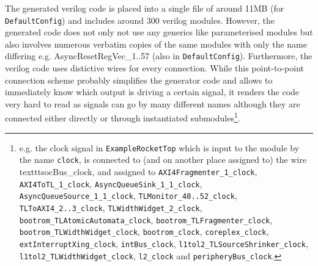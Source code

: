 \documentclass[journal,a4paper]{IEEEtran}
\begin{document}
The generated verilog code is placed into a single file of around 11MB (for \texttt{DefaultConfig}) and includes around 300 verilog modules.
However, the generated code does not only not use any generics like parameterised modules but also involves numerous verbatim copies of the same modules with only the name differing e.g. AsyncResetRegVec\_1..57 (also in \texttt{DefaultConfig}).
Furthermore, the verilog code uses distictive wires for every connection. While this point-to-point connection scheme probably simplifies the generator code and allows to immediately know which output is driving a certain signal, it renders the code very hard to read as signals can go by many different names although they are connected either directly or through instantiated submodules\footnote{e.g. the clock signal in \texttt{ExampleRocketTop} which is input to the module by the name \texttt{clock}, is connected to (and on another place assigned to) the wire texttt{socBus\_clock}, and assigned to \texttt{AXI4Fragmenter\_1\_clock}, \texttt{AXI4ToTL\_1\_clock}, \texttt{AsyncQueueSink\_1\_1\_clock}, \texttt{AsyncQueueSource\_1\_1\_clock}, \texttt{TLMonitor\_40..52\_clock}, \texttt{TLToAXI4\_2..3\_clock}, \texttt{TLWidthWidget\_2\_clock}, \texttt{bootrom\_TLAtomicAutomata\_clock}, \texttt{bootrom\_TLFragmenter\_clock}, \texttt{bootrom\_TLWidthWidget\_clock}, \texttt{bootrom\_clock}, \texttt{coreplex\_clock}, \texttt{extInterruptXing\_clock}, \texttt{intBus\_clock}, \texttt{l1tol2\_TLSourceShrinker\_clock}, \texttt{l1tol2\_TLWidthWidget\_clock}, \texttt{l2\_clock} and \texttt{peripheryBus\_clock}.}.



\end{document}
